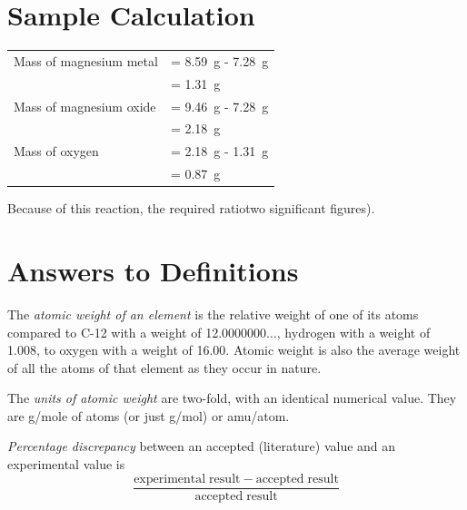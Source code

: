 \documentclass{article}
\begin{document}

\section{Sample Calculation}

\begin{tabular}{ll}
Mass of magnesium metal & = \SI{8.59}{\gram} - \SI{7.28}{\gram}\\
& = \SI{1.31}{\gram}\\
Mass of magnesium oxide & = \SI{9.46}{\gram} - \SI{7.28}{\gram}\\
& = \SI{2.18}{\gram}\\
Mass of oxygen & = \SI{2.18}{\gram} - \SI{1.31}{\gram}\\
& = \SI{0.87}{\gram}
\end{tabular}

Because of this reaction, the required ratiotwo significant figures).





\section{Answers to Definitions}

\begin{enumerate}
\begin{item}
The \emph{atomic weight of an element} is the relative weight of one of its atoms compared to C-12 with a weight of 12.0000000$\ldots$, hydrogen with a weight of 1.008, to oxygen with a weight of 16.00. Atomic weight is also the average weight of all the atoms of that element as they occur in nature.
\end{item}
\begin{item}
The \emph{units of atomic weight} are two-fold, with an identical numerical value. They are g/mole of atoms (or just g/mol) or amu/atom.
\end{item}
\begin{item}
\emph{Percentage discrepancy} between an accepted (literature) value and an experimental value is
\begin{equation*}
\frac{\mathrm{experimental\;result} - \mathrm{accepted\;result}}{\mathrm{accepted\;result}}
\end{equation*}
\end{item}
\end{enumerate}






\end{document}
